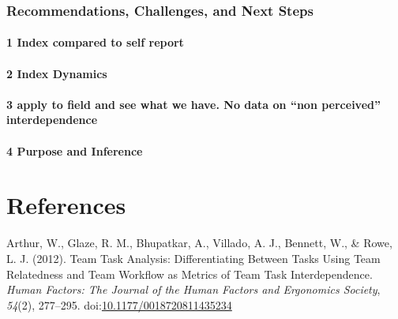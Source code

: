 \documentclass[english,,man]{apa6}
\let\oldparagraph\paragraph
\renewcommand{\paragraph}[1]{\oldparagraph{#1}\mbox{}}
\theoremstyle{definition}
\theoremstyle{definition}
\theoremstyle{definition}
\theoremstyle{remark}
\begin{document}
\hypertarget{recommendations-challenges-and-next-steps}{%
\subsubsection{Recommendations, Challenges, and Next
Steps}\label{recommendations-challenges-and-next-steps}}

\hypertarget{index-compared-to-self-report}{%
\paragraph{1 Index compared to self
report}\label{index-compared-to-self-report}}

\hypertarget{index-dynamics}{%
\paragraph{2 Index Dynamics}\label{index-dynamics}}

\hypertarget{apply-to-field-and-see-what-we-have.-no-data-on-non-perceived-interdependence}{%
\paragraph{\texorpdfstring{3 apply to field and see what we have. No
data on \enquote{non perceived}
interdependence}{3 apply to field and see what we have. No data on ``non perceived'' interdependence}}\label{apply-to-field-and-see-what-we-have.-no-data-on-non-perceived-interdependence}}

\hypertarget{purpose-and-inference-1}{%
\paragraph{4 Purpose and Inference}\label{purpose-and-inference-1}}

\newpage

\hypertarget{references}{%
\section{References}\label{references}}

\setlength{\parindent}{-0.5in}
\setlength{\leftskip}{0.5in}

\hypertarget{refs}{}
\leavevmode\hypertarget{ref-arthur_team_2012}{}%
Arthur, W., Glaze, R. M., Bhupatkar, A., Villado, A. J., Bennett, W., \&
Rowe, L. J. (2012). Team Task Analysis: Differentiating Between Tasks
Using Team Relatedness and Team Workflow as Metrics of Team Task
Interdependence. \emph{Human Factors: The Journal of the Human Factors
and Ergonomics Society}, \emph{54}(2), 277--295.
doi:\href{https://doi.org/10.1177/0018720811435234}{10.1177/0018720811435234}
\end{document}
